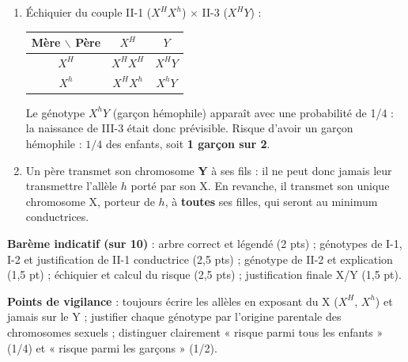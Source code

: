 \documentclass[11pt]{article}
\begin{document}
\begin{corrige}
\begin{enumerate}
\item Échiquier du couple II-1 ($X^{H}X^{h}$) $\times$ II-3 ($X^{H}Y$) :
\begin{center}
\begin{tabular}{|c|c|c|}
\hline
\rowcolor{popblueL} Mère $\backslash$ Père & $X^{H}$ & $Y$ \\
\hline
$X^{H}$ & $X^{H}X^{H}$ & $X^{H}Y$ \\
\hline
$X^{h}$ & $X^{H}X^{h}$ & $X^{h}Y$ \\
\hline
\end{tabular}
\end{center}
Le génotype $X^{h}Y$ (garçon hémophile) apparaît avec une probabilité de 1/4 : la naissance de III-3 était donc prévisible. Risque d'avoir un garçon hémophile : $1/4$ des enfants, soit \textbf{1 garçon sur 2}.
\item Un père transmet son chromosome \textbf{Y} à ses fils : il ne peut donc jamais leur transmettre l'allèle $h$ porté par son X. En revanche, il transmet son unique chromosome X, porteur de $h$, à \textbf{toutes} ses filles, qui seront au minimum conductrices.
\end{enumerate}
\textbf{Barème indicatif (sur 10)} : arbre correct et légendé (2 pts) ; génotypes de I-1, I-2 et justification de II-1 conductrice (2,5 pts) ; génotype de II-2 et explication (1,5 pt) ; échiquier et calcul du risque (2,5 pts) ; justification finale X/Y (1,5 pt).

\textbf{Points de vigilance} : toujours écrire les allèles en exposant du X ($X^{H}$, $X^{h}$) et jamais sur le Y ; justifier chaque génotype par l'origine parentale des chromosomes sexuels ; distinguer clairement « risque parmi tous les enfants » (1/4) et « risque parmi les garçons » (1/2).
\end{corrige}
\end{document}
